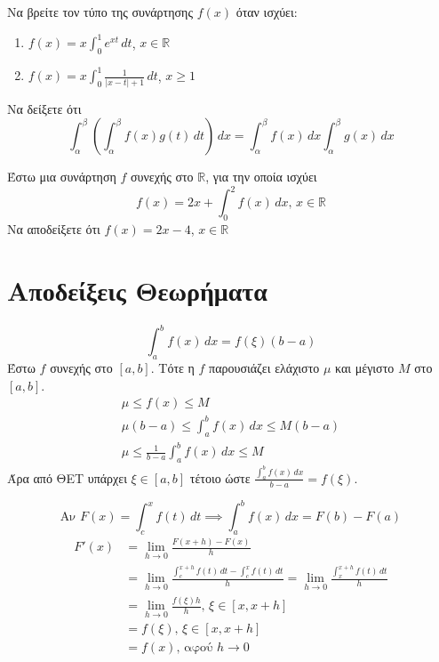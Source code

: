 \documentclass{presentation}
\begin{document}
\begin{askisi}
  Να βρείτε τον τύπο της συνάρτησης $f(x)$ όταν ισχύει:
  \begin{enumerate}[<+->]
    \item $f(x)=x\int_{0}^{1}e^{xt}\, dt$, $x\in\mathbb{R}$
    \item $f(x)=x\int_{0}^{1}\frac{1}{|x-t|+1}\, dt$, $x\ge 1$
  \end{enumerate}
\end{askisi}

\begin{askisi}
  Να δείξετε ότι $$\int_{α}^{β}\left( \int_{α}^{β}f(x)g(t) \, dt \right) \, dx=\int_{α}^{β}f(x) \, dx\int_{α}^{β}g(x) \, dx$$
\end{askisi}

\begin{askisi}
  Έστω μια συνάρτηση $f$ συνεχής στο $\mathbb{R}$, για την οποία ισχύει
  $$f(x)=2x+\int_{0}^{2}f(x) \, dx \text{, } x\in\mathbb{R}$$
  Να αποδείξετε ότι $f(x)=2x-4$, $x\in\mathbb{R}$
\end{askisi}

\appendix

\section{Αποδείξεις Θεωρήματα}

\begin{apodiksi}
  $$\int_a^b f(x)\,dx = f(ξ)(b-a)$$
  Έστω $f$ συνεχής στο $[a,b]$. Τότε η $f$ παρουσιάζει ελάχιστο $μ$ και μέγιστο $Μ$ στο $[a,b]$. \pause
  \begin{gather*}
    μ\le f(x) \le Μ                        \\
    μ(b-a)\le \int_a^b f(x)\,dx \le Μ(b-a) \\
    μ \le \frac{1}{b-a}\int_a^b f(x)\,dx \le Μ
  \end{gather*}
  Άρα από ΘΕΤ υπάρχει $ξ\in [a,b]$ τέτοιο ώστε $\frac{\int_a^b f(x)\,dx}{b-a} = f(ξ)$.
\end{apodiksi}

\begin{apodiksi}[Αρχική = Ορισμένο Ολοκλήρωμα]
  $$\text{Αν } F(x)=\int_c^x f(t)\,dt \implies \int_a^b f(x)\,dx = F(b)-F(a)$$
  \begin{align*}
    F'(x) & =\lim_{h\to 0}\frac{F(x+h)-F(x)}{h}                                                                         \\
          & =\lim_{h\to 0}\frac{\int_c^{x+h}f(t)\,dt-\int_c^x f(t)\,dt}{h} =\lim_{h\to 0}\frac{\int_x^{x+h}f(t)\,dt}{h} \\
          & =\lim_{h\to 0}\frac{f(ξ)h}{h} \text{, } ξ\in [x,x+h]                                                        \\
          & =f(ξ) \text{, } ξ\in [x,x+h]                                                                                \\
          & =f(x) \text{, } \text{αφού } h\to 0
  \end{align*}
\end{apodiksi}
\end{document}
